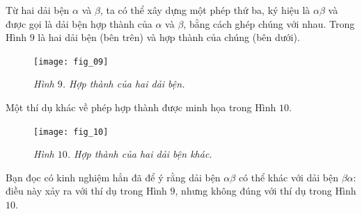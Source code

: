 \begin{multicols}{2}
	Từ hai dải bện $\alpha$ và $\beta$, ta có thể xây dựng một phép thứ ba, ký hiệu là $\alpha \beta$ và được gọi là dải bện hợp thành của $\alpha$ và $\beta$, bằng cách ghép chúng với nhau. Trong Hình $9$ là hai dải bện (bên trên) và hợp thành của chúng (bên dưới).
	\begin{figure}[H]
		\vspace*{-8pt}
		\centering
		\captionsetup{labelformat= empty, justification=centering}
		\texttt{[image: fig\_09]}
		\caption{\small\textit{\color{duongvaotoanhoc}Hình $9$. Hợp thành của hai dải bện.}}
		\vspace*{-5pt}
	\end{figure}
	Một thí dụ khác về phép hợp thành được minh họa trong Hình $10$.
	\begin{figure}[H]
		\vspace*{-8pt}
		\centering
		\captionsetup{labelformat= empty, justification=centering}
		\texttt{[image: fig\_10]}
		\caption{\small\textit{\color{duongvaotoanhoc}Hình $10$. Hợp thành của hai dải bện khác.}}
		\vspace*{-10pt}
	\end{figure}
	Bạn đọc có kinh nghiệm hẳn đã để ý rằng dải bện $\alpha \beta$ có thể khác với dải bện $\beta \alpha$: điều này xảy ra với thí dụ trong Hình $9$, nhưng không đúng với thí dụ trong Hình $10$.
	

\end{multicols}
